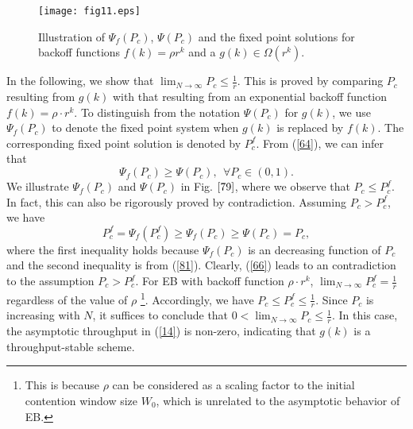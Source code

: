 \documentclass[journal]{IEEEtran}
\begin{document}
\begin{figure}
\centering
  \begin{center}
    \texttt{[image: fig11.eps]}
  \end{center}
  \caption{Illustration of $\Psi_f\left(P_c\right)$, $\Psi\left(P_c\right)$ and the fixed point solutions for backoff functions $f(k)=\rho r^k$ and a $g(k)\in \Omega\left(r^k\right)$.}
  \label{79}
\end{figure}

In the following, we show that $\lim_{N\rightarrow \infty} P_c\leq \frac{1}{r}$. This is proved by comparing $P_c$ resulting from $g(k)$ with that resulting from an exponential backoff function $f(k)=\rho \cdot r^k$. To distinguish from the notation $\Psi(P_c)$ for $g(k)$, we use $\Psi_f\left(P_c\right)$ to denote the fixed point system when $g(k)$ is replaced by $f(k)$. The corresponding fixed point solution is denoted by $P_c^f$. From (\ref{64}), we can infer that
\begin{equation}
\label{81}
\Psi_f\left(P_c\right)\geq \Psi\left(P_c\right),\ \  \forall P_c\in (0,1).
\end{equation}
We illustrate $\Psi_f\left(P_c\right)$ and $\Psi\left(P_c\right)$ in Fig. $\ref{79}$, where we observe that $P_c\leq P_c^f$. In fact, this can also be rigorously proved by contradiction. Assuming $P_c> P_c^f$, we have
\begin{equation}
\label{66}
P_c^f=\Psi_f\left(P_c^f\right) \geq \Psi_f\left(P_c\right) \geq \Psi\left(P_c\right)= P_c,
\end{equation}
where the first inequality holds because $\Psi_f\left(P_c\right)$ is an decreasing function of $P_c$ and the second inequality is from (\ref{81}). Clearly, (\ref{66}) leads to an contradiction to the assumption $P_c> P_c^f$. For EB with backoff function $\rho\cdot r^k$, $\lim_{N\rightarrow \infty}P_c^f =\frac{1}{r}$ regardless of the value of $\rho$ \footnote{This is because $\rho$ can be considered as a scaling factor to the initial contention window size $W_0$, which is unrelated to the asymptotic behavior of EB.}. Accordingly, we have $P_c\leq P_c^f\leq \frac{1}{r}$. Since $P_c$ is increasing with $N$, it suffices to conclude that $0<\lim_{N\rightarrow\infty}P_c\leq \frac{1}{r}$. In this case, the asymptotic throughput in (\ref{14}) is non-zero, indicating that $g(k)$ is a throughput-stable scheme.
\end{document}
